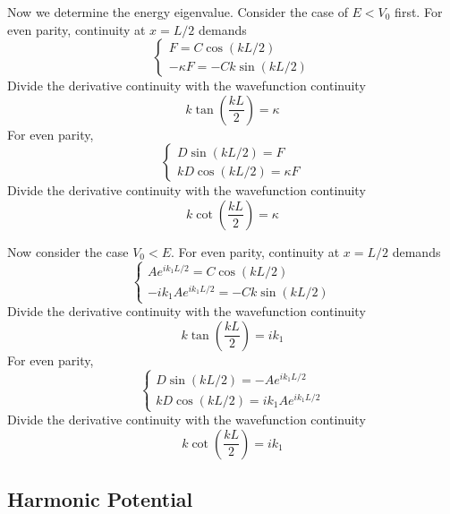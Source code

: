 \documentclass[../../../main.tex]{subfiles}
\begin{document}
Now we determine the energy eigenvalue.
Consider the case of $E<V_0$ first.
For even parity, continuity at $x=L/2$ demands
\begin{equation*}
  \begin{cases}
    F=C \cos \left(  kL/2 \right) \\
    -\kappa F =-C k \sin  \left( kL/2\right)
  \end{cases}
\end{equation*}
Divide the derivative continuity with the wavefunction continuity
\begin{equation*}
  k \tan \left( \frac{k L}{2} \right) =\kappa
\end{equation*}
For even parity,
\begin{equation*}
  \begin{cases}
    D \sin (kL/2)=F \\
    kD \cos (kL/2)=\kappa F
  \end{cases}
\end{equation*}
Divide the derivative continuity with the wavefunction continuity
\begin{equation*}
  k \cot \left( \frac{k L}{2} \right) =\kappa
\end{equation*}

Now consider the case $V_0<E$.
For even parity, continuity at $x=L/2$ demands
\begin{equation*}
  \begin{cases}
    Ae^{ik_1L/2}=C \cos (kL/2) \\
    -ik_1 Ae^{ik_1L/2}=-C k \sin  \left( kL/2\right)
  \end{cases}
\end{equation*}
Divide the derivative continuity with the wavefunction continuity
\begin{equation*}
  k \tan \left( \frac{k L}{2} \right) =ik_1
\end{equation*}
For even parity,
\begin{equation*}
  \begin{cases}
    D \sin (kL/2)=-Ae^{ik_1L/2} \\
    kD \cos (kL/2)=ik_1Ae^{ik_1L/2}
  \end{cases}
\end{equation*}
Divide the derivative continuity with the wavefunction continuity
\begin{equation*}
  k \cot \left( \frac{k L}{2} \right) =ik_1
\end{equation*}

\subsection{Harmonic Potential}
\end{document}
